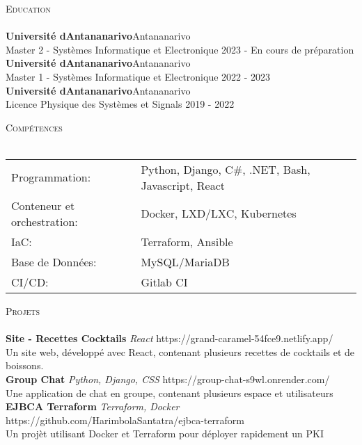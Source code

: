 \documentclass[a4paper]{article}
\newcommand{\lineunder} {
    \vspace*{-8pt} \\
    \hspace*{-18pt} \hrulefill \\
}
\newcommand{\header} [1] {
    {\hspace*{-18pt}\vspace*{6pt} \textsc{#1}}
    \vspace*{-6pt} \lineunder
}
\begin{document}
\header{Education}
\textbf{Université d\textquotesingle{}Antananarivo}\hfill Antananarivo\\
Master 2 - Systèmes Informatique et Electronique \hfill 2023 - En cours de préparation\\
\vspace{2mm}
\textbf{Université d\textquotesingle{}Antananarivo}\hfill Antananarivo\\
Master 1 - Systèmes Informatique et Electronique \hfill 2022 - 2023\\
\vspace{2mm}
\textbf{Université d\textquotesingle{}Antananarivo}\hfill Antananarivo\\
Licence Physique des Systèmes et Signals \hfill 2019 - 2022\\
\vspace{2mm}

\header{Compétences}
\begin{tabular}{ l l }
	Programmation:              & Python, Django, C\#, .NET, Bash, Javascript, React           \\
	Conteneur et orchestration: & Docker, LXD/LXC, Kubernetes \\
	IaC:                        & Terraform, Ansible          \\
	Base de Données:           & MySQL/MariaDB               \\
	CI/CD:           & Gitlab CI               \\
\end{tabular}
\vspace{2mm}

\header{Projets}
{\textbf{Site - Recettes Cocktails}} {\sl React} \hfill https://grand-caramel-54fce9.netlify.app/\\
Un site web, développé avec React, contenant plusieurs recettes de cocktails et de boissons.\\
\vspace*{2mm}
{\textbf{Group Chat}} {\sl Python, Django, CSS} \hfill https://group-chat-s9wl.onrender.com/\\
Une application de chat en groupe, contenant plusieurs espace et utilisateurs\\
\vspace*{2mm}
{\textbf{EJBCA Terraform}} {\sl Terraform, Docker} \hfill https://github.com/HarimbolaSantatra/ejbca-terraform\\
Un projèt utilisant Docker et Terraform pour déployer rapidement un PKI\\
\vspace*{2mm}



\ 
\end{document}
